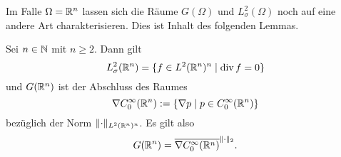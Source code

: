 Im Falle $\Omega = \mathbb{R}^n$ lassen sich die Räume $G(\Omega)$ und $L_\sigma^2(\Omega)$ noch auf eine andere Art charakterisieren.
Dies ist Inhalt des folgenden Lemmas.

\begin{lem}
  Sei $n \in \mathbb{N}$ mit $n \geq 2$.
  Dann gilt
  \begin{equation}
    \label{eq:LCharacterization}
    L_\sigma^2(\mathbb{R}^n) = \{ f \in L^2(\mathbb{R}^n)^n \mid \mathrm{div\,} f = 0 \}
  \end{equation}
  und $G(\mathbb{R}^n)$ ist der Abschluss des Raumes
  $$
  \nabla C_0^\infty(\mathbb{R}^n) := \{ \nabla p \mid p \in C_0^\infty(\mathbb{R}^n) \}
  $$
  bezüglich der Norm $\lVert \cdot \rVert_{L^2(\mathbb{R}^n)^n}$.
  Es gilt also
  \begin{equation}
    \label{eq:GCharacterization}
    G(\mathbb{R}^n) = \overline{\nabla C_0^\infty(\mathbb{R}^n)}^{\lVert \cdot \rVert_2}.
  \end{equation}
\end{lem}

